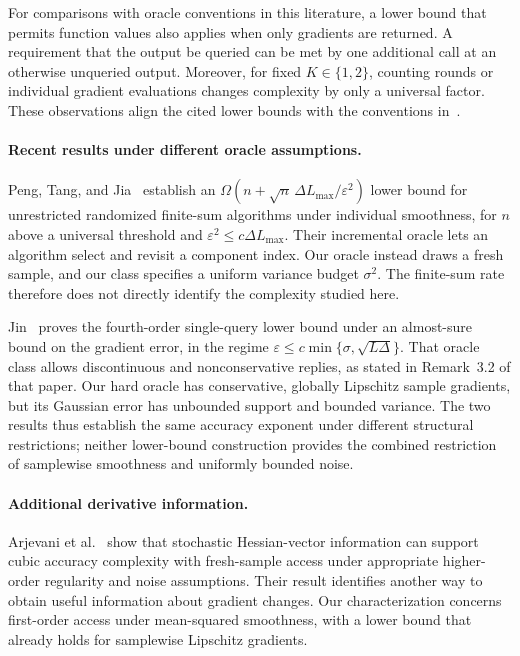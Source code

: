 \documentclass[11pt]{article}
\newcommand{\eps}{\varepsilon}
\theoremstyle{definition}
\theoremstyle{remark}
\begin{document}
For comparisons with oracle conventions in this literature, a lower bound
that permits function values also applies when only gradients are returned.
A requirement that the output be queried can be met by one additional
call at an otherwise unqueried output. Moreover, for fixed $K\in\{1,2\}$,
counting rounds or individual gradient evaluations changes complexity by
only a universal factor. These observations align the cited lower bounds
with the conventions in~.

\paragraph{Recent results under different oracle assumptions.}
Peng, Tang, and Jia~\cite{peng2026} establish an
$\Omega(n+\sqrt n\,\Delta L_{\max}/\eps^2)$ lower bound for
unrestricted randomized finite-sum algorithms under individual smoothness,
for $n$ above a universal threshold and
$\eps^2\le c\Delta L_{\max}$. Their incremental oracle lets an algorithm
select and revisit a component index. Our oracle instead draws a fresh
sample, and our class specifies a uniform variance budget $\sigma^2$.
The finite-sum rate therefore does not directly identify the complexity
studied here.

Jin~\cite{jin2026} proves the fourth-order single-query lower bound under
an almost-sure bound on the gradient error, in the regime
$\eps\le c\min\{\sigma,\sqrt{L\Delta}\}$. That oracle class allows
discontinuous and nonconservative replies, as stated in Remark~3.2 of that
paper. Our hard oracle has conservative, globally Lipschitz sample
gradients, but its Gaussian error has unbounded support and bounded
variance. The two results thus establish the same accuracy exponent under
different structural restrictions; neither lower-bound construction
provides the combined restriction of samplewise smoothness and uniformly
bounded noise.

\paragraph{Additional derivative information.}
Arjevani et al.~\cite{secondorder} show that stochastic Hessian-vector
information can support cubic accuracy complexity with fresh-sample
access under appropriate higher-order regularity and noise assumptions.
Their result identifies another way to obtain useful information about
gradient changes. Our characterization concerns first-order access under
mean-squared smoothness, with a lower bound that already holds for
samplewise Lipschitz gradients.
\end{document}
